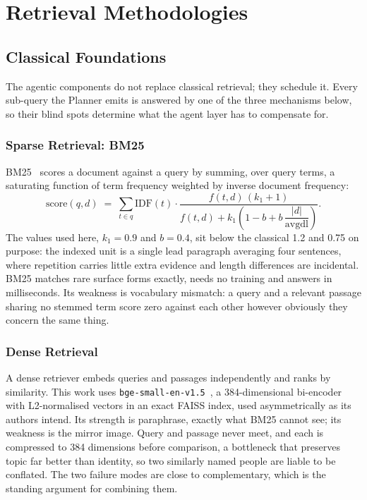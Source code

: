 \chapter{Retrieval Methodologies}
\label{ch:methodology}

\section{Classical Foundations}
\label{sec:classical}

The agentic components do not replace classical retrieval; they schedule it.
Every sub-query the Planner emits is answered by one of the three mechanisms
below, so their blind spots determine what the agent layer has to compensate
for.

\subsection{Sparse Retrieval: BM25}
\label{sec:bm25}

BM25~\cite{robertson2009probabilistic} scores a document against a query by
summing, over query terms, a saturating function of term frequency weighted by
inverse document frequency:
\[
  \mathrm{score}(q,d) \;=\; \sum_{t \in q} \mathrm{IDF}(t)\cdot
  \frac{f(t,d)\,(k_1+1)}
       {f(t,d) + k_1\!\left(1 - b + b\,\dfrac{|d|}{\mathrm{avgdl}}\right)} .
\]
The values used here, $k_1 = 0.9$ and $b = 0.4$, sit below the classical 1.2
and 0.75 on purpose: the indexed unit is a single lead paragraph averaging four
sentences, where repetition carries little extra evidence and length
differences are incidental. BM25 matches rare surface forms exactly, needs no
training and answers in milliseconds. Its weakness is vocabulary mismatch: a
query and a relevant passage sharing no stemmed term score zero against each
other however obviously they concern the same thing.

\subsection{Dense Retrieval}
\label{sec:dense}

A dense retriever embeds queries and passages independently and ranks by
similarity. This work uses \texttt{bge-small-en-v1.5}~\cite{xiao2023cpack}, a
384-dimensional bi-encoder with L2-normalised vectors in an exact FAISS index,
used asymmetrically as its authors intend. Its strength is paraphrase, exactly
what BM25 cannot see; its weakness is the mirror image. Query and passage never
meet, and each is compressed to 384 dimensions before comparison, a bottleneck
that preserves topic far better than identity, so two similarly named people
are liable to be conflated. The two failure modes are close to complementary,
which is the standing argument for combining them.

